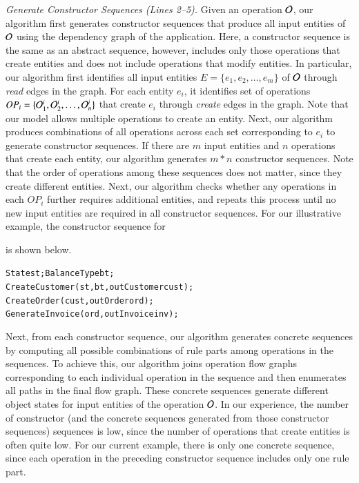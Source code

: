 \textit{Generate Constructor Sequences (Lines 2--5).} Given an operation ${\cal O}$, our algorithm
first generates constructor sequences that produce all input entities of ${\cal O}$
using the dependency graph of the application.
Here, a constructor sequence is the same as an abstract sequence, however, includes only those
operations that create entities and does not include operations that modify
entities. In particular, our algorithm first identifies all input entities 
$E = \{e_1, e_2, \ldots, e_m\}$ of ${\cal O}$ through \textit{read}
edges in the graph. For each entity $e_i$, it identifies set of operations 
$OP_i = \{{\cal O}^i_1, {\cal O}^i_2, \ldots, {\cal O}^i_n\}$
that create $e_i$ through \textit{create} edges in the graph. Note that our model
allows multiple operations to create an entity. Next, our algorithm produces
combinations of all operations across each set corresponding to $e_i$ 
to generate constructor sequences. If there are $m$ input entities
and $n$ operations that create each entity, our algorithm generates $m * n$
constructor sequences. Note that the order of operations 
among these sequences does not matter, since they create different entities.
Next, our algorithm checks whether any operations in each $OP_i$
further requires additional entities, and repeats this process until no 
new input entities are required in all constructor sequences. 
For our illustrative example, the constructor sequence for 
\subject{GenerateInvoice} is shown below.

\vspace*{-5pt}
{\small
\begin{alltt}
  State st; BalanceType bt;
  CreateCustomer(st, bt, out Customer cust);  
  CreateOrder(cust, out Order ord);
  GenerateInvoice(ord, out Invoice inv);  
\end{alltt}
}
\vspace*{-5pt}

Next, from each constructor sequence,
our algorithm generates concrete sequences by computing all possible combinations of
rule parts among operations in the sequences. To achieve this, our algorithm
joins operation flow graphs corresponding to each individual operation in the sequence and then
enumerates all paths in the final flow graph. These concrete sequences generate different
object states for input entities of the operation ${\cal O}$. In our experience,
the number of constructor (and the concrete sequences generated from those
constructor sequences) sequences is low, since the number of operations 
that create entities is often quite low. For our current example,
there is only one concrete sequence, since each operation in the
preceding constructor sequence includes only one rule part.

